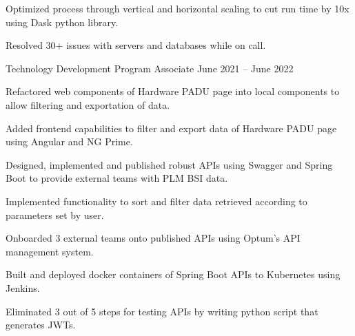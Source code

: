 \begin{cventries}
{\begin{cvitems}
        \item {Optimized process through vertical and horizontal scaling to cut run time by 10x using Dask python library.}
        \item {Resolved 30+ issues with servers and databases while on call.}
      \end{cvitems}
    }
  \cventry
    {Technology Development Program Associate} %
    {} %
    {} %
    {June 2021 – June 2022} %
    {
      \begin{cvitems} %
        \item {Refactored web components of Hardware PADU page into local components to allow filtering and exportation of data.}
        \item {Added frontend capabilities to filter and export data of Hardware PADU page using Angular and NG Prime.}
        \item {Designed, implemented and published robust APIs using Swagger and Spring Boot to provide external teams with PLM BSI data.}
        \item {Implemented functionality to sort and filter data retrieved according to parameters set by user.}
        \item {Onboarded 3 external teams onto published APIs using Optum's API management system.}
        \item {Built and deployed docker containers of Spring Boot APIs to Kubernetes using Jenkins.}
        \item {Eliminated 3 out of 5 steps for testing APIs by writing python script that generates JWTs.}
      \end{cvitems}
    }

\end{cventries}
